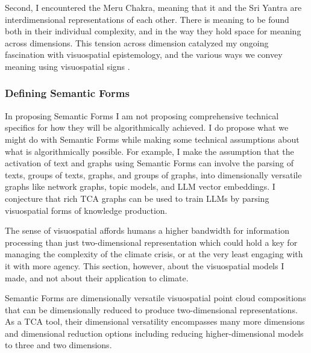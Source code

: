 Second, I encountered the Meru Chakra, meaning that it and the Sri Yantra are interdimensional representations of each other. There is meaning to be found both in their individual complexity, and in the way they hold space for meaning across dimensions. This tension across dimension catalyzed my ongoing fascination with visuospatial epistemology, and the various ways we convey meaning using visuospatial signs \citep{midgley_theory_1998,dubois_systematic_2002,drucker_graphesis_2014,tversky_barbara_2022,sevaldson_designing_2022,anderson_drawing_2018}.
    
   

\subsubsection{Defining Semantic Forms}
In proposing Semantic Forms I am not proposing comprehensive technical specifics for how they will be algorithmically achieved. I do propose what we might do with Semantic Forms while making some technical assumptions about what is algorithmically possible. For example, I make the assumption that the activation of text and graphs using Semantic Forms can involve the parsing of texts, groups of texts, graphs, and groups of graphs, into dimensionally versatile graphs like network graphs, topic models, and LLM vector embeddings. I conjecture that rich TCA graphs can be used to train LLMs by parsing visuospatial forms of knowledge production.

The sense of visuospatial affords humans a higher bandwidth for information processing than just two-dimensional representation \citep{tversky_barbara_2022} which could hold a key for managing the complexity of the climate crisis, or at the very least engaging with it with more agency. This section, however, about the visuospatial models I made, and not about their application to climate. 

Semantic Forms are dimensionally versatile visuospatial point cloud compositions that can be dimensionally reduced to produce two-dimensional representations. As a TCA tool, their dimensional versatility encompasses many more dimensions and dimensional reduction options including reducing higher-dimensional models to three and two dimensions. 

